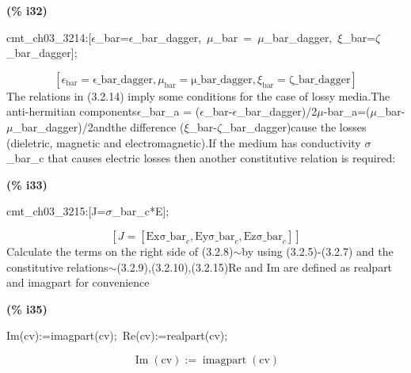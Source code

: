 \documentclass[fleqn]{article}
\begin{document}
\noindent
\begin{minipage}[t]{4.000000em}\color{red}\bfseries
(\% i32)	
\end{minipage}
\begin{minipage}[t]{\textwidth}\color{blue}
cmt\_ch03\_3214:[\ensuremath{\epsilon}\_bar=\ensuremath{\epsilon}\_bar\_dagger,\ \ensuremath{\mu}\_bar\ =\ \ensuremath{\mu}\_bar\_dagger,\ \ensuremath{\xi}\_bar=\ensuremath{\zeta}\_bar\_dagger];
\end{minipage}
\[\displaystyle \tag{cmt\_ ch03\_ 3214} 
\left[ {{\epsilon }_{\ensuremath{\mathrm{bar}}}}=\ensuremath{\mathrm{\epsilon \_ bar\_ dagger}}\operatorname{,}{{\mu }_{\ensuremath{\mathrm{bar}}}}=\ensuremath{\mathrm{\mu \_ bar\_ dagger}}\operatorname{,}{{\xi }_{\ensuremath{\mathrm{bar}}}}=\ensuremath{\mathrm{\zeta \_ bar\_ dagger}}\right] \mbox{}
\]
The relations in (3.2.14) imply some conditions for the case of lossy media.The anti-hermitian components\ensuremath{\epsilon}\_bar\_a = (\ensuremath{\epsilon}\_bar-\ensuremath{\epsilon}\_bar\_dagger)/2\ensuremath{\mu}-bar\_a=(\ensuremath{\mu}\_bar-\ensuremath{\mu}\_bar\_dagger)/2andthe difference (\ensuremath{\xi}\_bar-\ensuremath{\zeta}\_bar\_dagger)cause the losses (dieletric, magnetic and electromagnetic).If the medium has conductivity \ensuremath{\sigma}\_bar\_c that causes electric losses then another  constitutive relation is required:


\noindent
\begin{minipage}[t]{4.000000em}\color{red}\bfseries
(\% i33)	
\end{minipage}
\begin{minipage}[t]{\textwidth}\color{blue}
cmt\_ch03\_3215:[J=\ensuremath{\sigma}\_bar\_c*E];
\end{minipage}
\[\displaystyle \tag{cmt\_ ch03\_ 3215} 
\left[ J=\left[ \ensuremath{\mathrm{Ex}} {{\ensuremath{\mathrm{\sigma \_ bar}}}_c}\operatorname{,}\ensuremath{\mathrm{Ey}} {{\ensuremath{\mathrm{\sigma \_ bar}}}_c}\operatorname{,}\ensuremath{\mathrm{Ez}} {{\ensuremath{\mathrm{\sigma \_ bar}}}_c}\right] \right] \mbox{}
\]
Calculate the terms on the right side of (3.2.8)\ensuremath{\sim }by using (3.2.5)-(3.2.7) and the constitutive relations\ensuremath{\sim }(3.2.9),(3.2.10),(3.2.15)Re and Im are defined as realpart and imagpart for convenience


\noindent
\begin{minipage}[t]{4.000000em}\color{red}\bfseries
(\% i35)	
\end{minipage}
\begin{minipage}[t]{\textwidth}\color{blue}
Im(cv):=imagpart(cv);\ Re(cv):=realpart(cv);
\end{minipage}
\[\displaystyle \tag{\% o34} 
\operatorname{Im}\left( \ensuremath{\mathrm{cv}}\right) \operatorname{:=}\operatorname{imagpart}\left( \ensuremath{\mathrm{cv}}\right) \mbox{}\]
\end{document}
